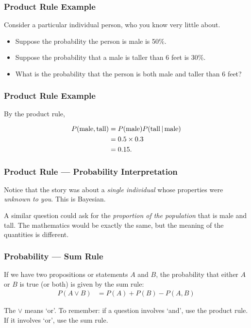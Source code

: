 \documentclass{beamer}
\newcommand{\given}{\,|\,}
\begin{document}
\begin{frame}
\frametitle{Product Rule Example}
Consider a particular individual person, who you know very little about.

\begin{itemize}
\item Suppose the probability the person is male is 50\%.
\item Suppose the probability that a male is taller than 6 feet is
30\%.
\item What is the probability that the person is both male and
taller than 6 feet?
\end{itemize}

\end{frame}

\begin{frame}
\frametitle{Product Rule Example}
By the product rule,

\begin{align}
P(\textnormal{male}, \textnormal{tall})
    &= P(\textnormal{male})P(\textnormal{tall} \given \textnormal{male})\\
    &= 0.5 \times 0.3\\
    &= 0.15.
\end{align}

\end{frame}

\begin{frame}
\frametitle{Product Rule --- Probability Interpretation}
Notice that the story was about a {\em single individual} whose properties
were {\em unknown to you}. This is Bayesian.\\[0.5em]\pause

A similar question could ask for the
{\em proportion of the population} that is male and tall.
The mathematics would be exactly the same, but the meaning of the quantities
is different.
\end{frame}

\begin{frame}
\frametitle{Probability --- Sum Rule}
If we have two propositions or
statements
 $A$ and $B$, the probability that either $A$ or $B$ is true (or both)
is given by the sum rule:
\begin{align}
P(A \vee B) &= P(A) + P(B) - P(A, B)
\end{align}\pause

The $\vee$ means `or'. To remember: if a question involves
`and', use the product rule. If it involves `or', use the sum rule.

\end{frame}
\end{document}
